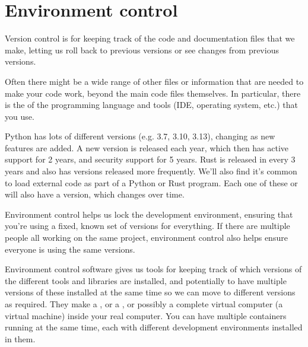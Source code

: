 \documentclass[letterpaper,10pt,british]{sphinxmanual}
\begin{document}
\sphinxstepscope


\section{Environment control}
\label{\detokenize{chapters/software_development_tools/environment_control:environment-control}}\label{\detokenize{chapters/software_development_tools/environment_control::doc}}
\sphinxAtStartPar
Version control is for keeping track of the code and documentation files that we make, letting us roll back to previous versions or see changes from previous versions.

\sphinxAtStartPar
Often there might be a wide range of other files or information that are needed to make your code work, beyond the main code files themselves. In particular, there is the  of the programming language and tools (IDE, operating system, etc.) that you use.

\sphinxAtStartPar
Python has lots of different versions (e.g. 3.7, 3.10, 3.13), changing as new features are added. A new version is released each year, which then has active support for 2 years, and security support for 5 years. Rust is released in  every 3 years and also has versions released more frequently. We’ll also find it’s common to load external code as part of a Python or Rust program. Each one of these  or  will also have a version, which changes over time.

\sphinxAtStartPar
Environment control helps us lock the development environment, ensuring that you’re using a fixed, known set of versions for everything. If there are multiple people all working on the same project, environment control also helps ensure everyone is using the same versions.

\sphinxAtStartPar
Environment control software gives us tools for keeping track of which versions of the different tools and libraries are installed, and potentially to have multiple versions of these installed at the same time so we can move to different versions as required. They make a , or a , or possibly a complete virtual computer (a virtual machine) inside your real computer. You can have multiple containers running at the same time, each with different development environments installed in them.
\end{document}
